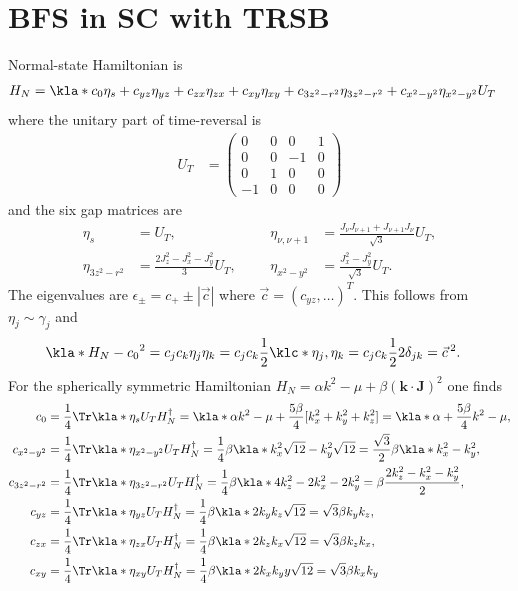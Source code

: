 \documentclass[english, parskip=full]{scrartcl}
\begin{document}
\section{BFS in SC with TRSB}
Normal-state Hamiltonian is
\begin{align}
H_N &= \kla*{c_0 \eta_s + c_{yz}\eta_{yz} + c_{zx}\eta_{zx} + c_{xy}\eta_{xy} + c_{3z^2-r^2} \eta_{3z^2-r^2} + c_{x^2-y^2}\eta_{x^2-y^2}}U_T
\end{align}
where the unitary part of time-reversal is
\begin{align}
U_T &= \begin{pmatrix}
0 & 0 & 0 & 1 \\
0 & 0 & -1 & 0 \\
0 & 1 & 0 & 0 \\
-1 & 0 & 0 & 0 
\end{pmatrix}
\end{align}
and the six gap matrices are
\begin{align}
\eta_s &= U_T,&&& \eta_{\nu,\nu+1} &= \frac{J_{\nu}J_{\nu+1} + J_{\nu+1}J_{\nu}}{\sqrt{3}} U_T, \\
\eta_{3z^2-r^2} &= \frac{2J_z^2-J_x^2-J_y^2}{3}U_T,  &&& \eta_{x^2-y^2} &= \frac{J_x^2-J_y^2}{\sqrt{3}}U_T.
\end{align}
The eigenvalues are $\epsilon_\pm = c_+ \pm |\vec{c}|$ where $\vec{c}=(c_{yz}, \dots)^T$.
This follows from $\eta_j \sim \gamma_j$ and
\begin{align}
\kla*{H_N-c_0}^2 &= c_jc_k\eta_j\eta_k = c_jc_k \frac{1}{2} \klc*{\eta_j, \eta_k} = c_jc_k\frac{1}{2}2\delta_{jk} = \vec{c}\,^2.
\end{align}
For the spherically symmetric Hamiltonian $H_N=\alpha k^2 - \mu + \beta (\textbf{k}\cdot \textbf{J})^2$ one finds
\begin{align}
c_0 &= \frac{1}{4}\Tr\kla*{\eta_s U_T H_N^\dagger} = \kla*{\alpha k^2 - \mu + \frac{5\beta}{4}[k_x^2 + k_y^2 + k_z^2] } = \kla*{\alpha + \frac{5\beta}{4}}k^2 - \mu,\\
c_{x^2-y^2} &= \frac{1}{4} \Tr\kla*{\eta_{x^2-y^2} U_T H_N^\dagger} = \frac{1}{4} \beta \kla*{k_x^2 \sqrt{12} - k_y^2 \sqrt{12}} = \frac{\sqrt{3}}{2} \beta \kla*{k_x^2-k_y^2},\\
c_{3z^2-r^2} &= \frac{1}{4} \Tr\kla*{\eta_{3z^2 - r^2} U_T H_N^\dagger} = \frac{1}{4} \beta \kla*{4k_z^2-2k_x^2-2k_y^2} = \beta\frac{2k_z^2-k_x^2-k_y^2}{2},\\
c_{yz} &= \frac{1}{4} \Tr\kla*{\eta_{yz} U_T H_N^\dagger} = \frac{1}{4} \beta \kla*{2k_yk_z \sqrt{12}} = \sqrt{3} \beta k_yk_z,\\
c_{zx} &= \frac{1}{4} \Tr\kla*{\eta_{zx} U_T H_N^\dagger} = \frac{1}{4} \beta \kla*{2k_zk_x \sqrt{12}} = \sqrt{3} \beta k_zk_x,\\
c_{xy} &= \frac{1}{4} \Tr\kla*{\eta_{xy} U_T H_N^\dagger} = \frac{1}{4} \beta \kla*{2k_xk_yy \sqrt{12}} = \sqrt{3} \beta k_xk_y
\end{align}
\end{document}
